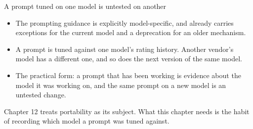 \documentclass[aspectratio=169,11pt]{beamer}
\newcommand{\standing}[1]{\par\vspace{0.25em}{\footnotesize\color{uhslate}\textbf{Standing:} #1}}
\begin{document}
\begin{frame}{A prompt tuned on one model is untested on another}
  \begin{itemize}\small
    \item The prompting guidance is explicitly model-specific, and already carries exceptions
          for the current model and a deprecation for an older mechanism.
    \item A prompt is tuned against one model's rating history. Another vendor's model has a
          different one, and so does the next version of the same model.
    \item The practical form: a prompt that has been working is evidence about the model it
          was working on, and the same prompt on a new model is an untested change.
  \end{itemize}
  \vspace{0.3em}
  {\small Chapter 12 treats portability as its subject. What this chapter needs is the habit
   of recording which model a prompt was tuned against.}
  \standing{documented.}
\end{frame}
\end{document}
